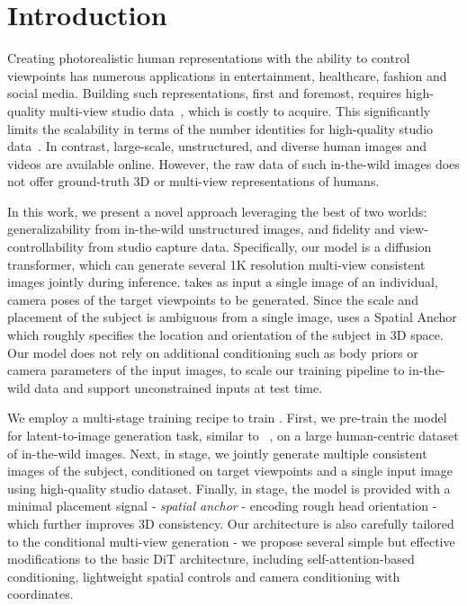 \section{Introduction}

Creating photorealistic human representations with the ability to control viewpoints has numerous applications in entertainment, healthcare, fashion and
social media. 
Building such representations, first and foremost, requires high-quality multi-view studio data~\cite{isik2023humanrf, bagautdinov2021driving}, which is costly to acquire.
This significantly limits the scalability in terms of the number identities for high-quality studio data~\cite{isik2023humanrf, martinez2024codec, xiong2024mvhumannet}.
In contrast, large-scale, unstructured, and diverse human images and videos are available online. 
However, the raw data of such in-the-wild images does not offer ground-truth 3D or multi-view representations of humans. 



In this work, we present a novel approach leveraging the best of two worlds: 
generalizability from in-the-wild unstructured images, and fidelity and view-controllability from studio capture data. 
Specifically, our model \ourmodel is a diffusion transformer, which can generate several 1K resolution multi-view consistent images jointly during inference.
\ourmodel takes as input a single image of an individual, camera poses of the target viewpoints to be generated. Since the scale and placement of the subject is ambiguous from a single image, \ourmodel uses a Spatial Anchor which roughly specifies the location and orientation of the subject in 3D space.
Our model does not rely on additional conditioning such as body priors or
camera parameters of the input images, to scale our training pipeline to in-the-wild data and support unconstrained inputs at test time.

We employ a multi-stage training recipe to train \ourmodel. First, we pre-train the model for latent-to-image generation task, similar to ~\cite{DALLE-2}, on a large human-centric dataset of in-the-wild images.
Next, in \midtraining stage, we jointly generate multiple consistent images of the subject, conditioned on target viewpoints and a single input image using high-quality studio dataset. 
Finally, in \posttraining stage, the model is provided with a minimal 
placement signal - \textit{spatial anchor} - encoding rough head orientation - 
which further improves 3D consistency.
Our architecture is also carefully tailored to the conditional multi-view generation - we propose several 
simple but effective modifications to the basic DiT architecture, including self-attention-based conditioning,
lightweight spatial controls and camera conditioning with \plucker coordinates.



